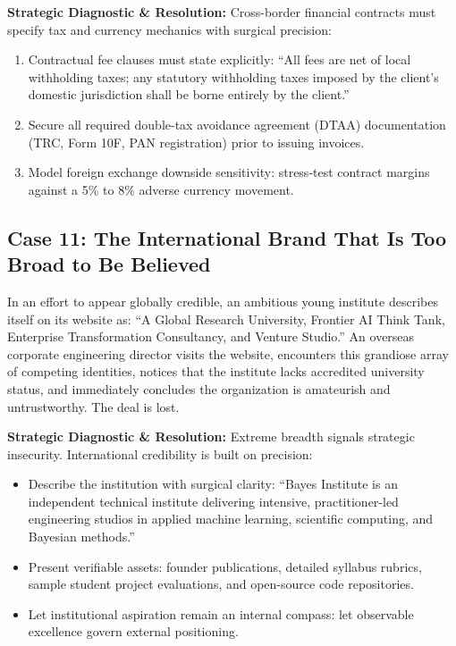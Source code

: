 \textbf{Strategic Diagnostic \& Resolution:} Cross-border financial contracts must specify tax and currency mechanics with surgical precision:
\begin{enumerate}
\item Contractual fee clauses must state explicitly: ``All fees are net of local withholding taxes; any statutory withholding taxes imposed by the client's domestic jurisdiction shall be borne entirely by the client.''
\item Secure all required double-tax avoidance agreement (DTAA) documentation (TRC, Form 10F, PAN registration) prior to issuing invoices.
\item Model foreign exchange downside sensitivity: stress-test contract margins against a 5\% to 8\% adverse currency movement.
\end{enumerate}

\subsection{Case 11: The International Brand That Is Too Broad to Be Believed}
\label{sec:case11_brand_too_broad_to_believe}

In an effort to appear globally credible, an ambitious young institute describes itself on its website as: ``A Global Research University, Frontier AI Think Tank, Enterprise Transformation Consultancy, and Venture Studio.'' An overseas corporate engineering director visits the website, encounters this grandiose array of competing identities, notices that the institute lacks accredited university status, and immediately concludes the organization is amateurish and untrustworthy. The deal is lost.

\textbf{Strategic Diagnostic \& Resolution:} Extreme breadth signals strategic insecurity. International credibility is built on precision:
\begin{itemize}
\item Describe the institution with surgical clarity: ``Bayes Institute is an independent technical institute delivering intensive, practitioner-led engineering studios in applied machine learning, scientific computing, and Bayesian methods.''
\item Present verifiable assets: founder publications, detailed syllabus rubrics, sample student project evaluations, and open-source code repositories.
\item Let institutional aspiration remain an internal compass: let observable excellence govern external positioning.
\end{itemize}

